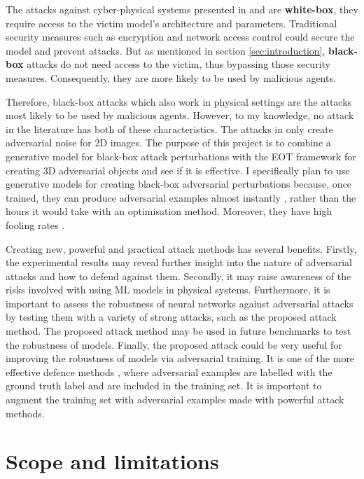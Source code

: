 The attacks against cyber-physical systems presented in \cite{athalye} and \cite{evtimov_road_signs} are \textbf{white-box}, they require access to the victim model's architecture and parameters. Traditional security measures such as encryption and network access control could secure the model and prevent attacks. But as mentioned in section \ref{sec:introduction}, \textbf{black-box} attacks do not need access to the victim, thus bypassing those security measures. Consequently, they are more likely to be used by malicious agents. 

Therefore, black-box attacks which also work in physical settings are the attacks most likely to be used by malicious agents. However, to my knowledge, no attack in the literature has both of these characteristics. The attacks in \cite{upset_angri, zheng_black_box_GAN, advGAN} only create adversarial noise for 2D images. The purpose of this project is to combine a generative model for black-box attack perturbations with the EOT framework for creating 3D adversarial objects \cite{athalye} and see if it is effective.  I specifically plan to use generative models for creating black-box adversarial perturbations because, once trained, they can produce adversarial examples almost instantly \cite{advGAN}, rather than the hours it would take with an optimisation method. Moreover, they have high fooling rates \cite{upset_angri, zheng_black_box_GAN, advGAN}.

Creating new, powerful and practical attack methods has several benefits. Firstly, the experimental results may reveal further insight into the nature of adversarial attacks and how to defend against them. Secondly, it may raise awareness of the risks involved with using ML models in physical systems. Furthermore, it is important to assess the robustness of neural networks against adversarial attacks by testing them with a variety of strong attacks, such as the proposed attack method. The proposed attack method may be used in future benchmarks to test the robustness of models. Finally, the proposed attack could be very useful for improving the robustness of models via adversarial training. It is one of the more effective defence methods \cite{dong2020benchmarking}, where adversarial examples are labelled with the ground truth label and are included in the training set. It is important to augment the training set with adversarial examples made with powerful attack methods.

\section{Scope and limitations}
    \label{sec:scope_limitations}
    
